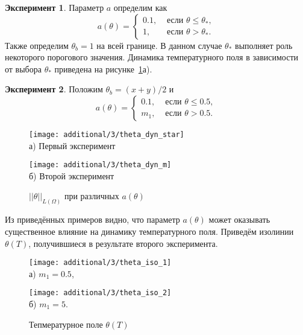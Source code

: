 \textbf{Эксперимент 1}.
Параметр $a$ определим как
\[
    a(\theta)=
    \begin{cases}
        0.1, & \text { если } \theta \leq \theta_{*}, \\
        1, & \text { если } \theta>\theta_{*}.
    \end{cases}
\]
Также определим $\theta_b = 1$ на всей границе.
В данном случае $\theta_{*}$ выполняет роль некоторого порогового значения.
Динамика температурного поля в зависимости от выбора $\theta_*$ приведена на рисунке~\ref{fig:4_3:theta_dyn_diff}а).


\textbf{Эксперимент 2}.
Положим $\theta_b = (x + y) /2$ и
\[
    a(\theta)=
    \begin{cases}
        0.1, & \text { если } \theta \leq 0.5, \\
        m_1, & \text { если } \theta > 0.5.
    \end{cases}
\]

\begin{figure}[h!t]
    \begin{minipage}[b][][b]{0.49\linewidth}
        \centering
        \texttt{[image: additional/3/theta\_dyn\_star]} \\ а) Первый эксперимент
    \end{minipage}
    \hfill
    \begin{minipage}[b][][b]{0.49\linewidth}
        \centering
        \texttt{[image: additional/3/theta\_dyn\_m]} \\ б) Второй эксперимент
    \end{minipage}
    \caption{$||\theta||_{L(\Omega)}$ при различных $a(\theta)$}
    \label{fig:4_3:theta_dyn_diff}
\end{figure}

Из приведённых примеров видно, что параметр $a(\theta)$ может оказывать существенное влияние
на динамику температурного поля.
Приведём изолинии $\theta(T)$, получившиеся в результате второго эксперимента.
\begin{figure}[h!t]
    \begin{minipage}[b][][b]{0.49\linewidth}
        \centering
        \texttt{[image: additional/3/theta\_iso\_1]} \\ а) $m_1 = 0.5$,
    \end{minipage}
    \hfill
    \begin{minipage}[b][][b]{0.49\linewidth}
        \centering
        \texttt{[image: additional/3/theta\_iso\_2]} \\ б) $m_1 = 5$.
    \end{minipage}
    \caption{Тепмературное поле $\theta (T)$}
    \label{fig:4_3:theta_iso_2exp}
\end{figure}

